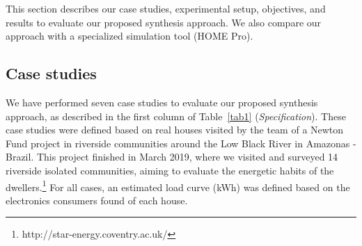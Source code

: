 \documentclass[journal]{IEEEtran}
\begin{document}
This section describes our case studies, experimental setup,  objectives, and results to evaluate our proposed synthesis approach. We also compare our approach with a specialized simulation tool (HOME Pro).

\subsection{Case studies} 

We have performed seven case studies to evaluate our proposed synthesis approach, as described in the first column of Table~\ref{tab1} (\textit{Specification}). These case studies were defined based on real houses visited by the team of a Newton Fund project in riverside communities around the Low Black River in Amazonas - Brazil. This project finished in March 2019, where we visited and surveyed 14 riverside isolated communities, aiming to evaluate the energetic habits of the dwellers.\footnote{http://star-energy.coventry.ac.uk/} For all cases, an estimated load curve (kWh) was defined based on the electronics consumers found of each house.
\end{document}
